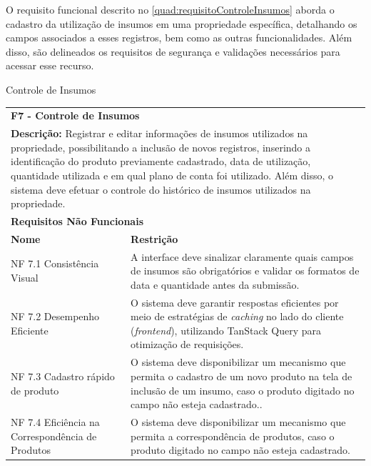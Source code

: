 O requisito funcional descrito no \autoref{quad:requisitoControleInsumos}  aborda o cadastro da utilização de insumos em uma propriedade específica, detalhando os campos associados a esses registros, bem como as outras funcionalidades. Além disso, são delineados os requisitos de segurança e validações necessários para acessar esse recurso.

\begin{tabframed}[htb]
  \caption{Controle de Insumos}
  \label{quad:requisitoControleInsumos}
  \renewcommand{\arraystretch}{1.5}
  \begin{tabular}{|l|l|}
    \cline{1-2}
    \multicolumn{2}{|l|}{\textbf{F7 - Controle de Insumos}}
    \\ \cline{1-2}

    \multicolumn{2}{|p{15cm}|}{
    \raggedright \textbf{Descrição:} Registrar e editar informações de insumos utilizados na propriedade, possibilitando a inclusão de novos registros, inserindo a identificação do produto previamente cadastrado, data de utilização, quantidade utilizada e em qual plano de conta foi utilizado. Além disso, o sistema deve efetuar o controle do histórico de insumos utilizados na propriedade.
    }
    \\ \cline{1-2}

    \multicolumn{2}{|l|}{\textbf{Requisitos Não Funcionais}}
    \\ \cline{1-2}

    \textbf{Nome}                                    &
    \textbf{Restrição}
    \\ \cline{1-2}

    NF 7.1 Consistência Visual                       &
    \multicolumn{1}{|p{8cm}|}{\raggedright A interface deve sinalizar claramente quais campos de insumos são obrigatórios e validar os formatos de data e quantidade antes da submissão.}
    \\ \cline{1-2}

    NF 7.2 Desempenho Eficiente                      &
    \multicolumn{1}{|p{8cm}|}{\raggedright O sistema deve garantir respostas eficientes por meio de estratégias de \textit{caching} no lado do cliente (\textit{frontend}), utilizando TanStack Query para otimização de requisições.}
    \\ \cline{1-2}

    NF 7.3 Cadastro rápido de produto                &
    \multicolumn{1}{|p{8cm}|}{\raggedright
    O sistema deve disponibilizar um mecanismo que permita o cadastro de um novo produto na tela de inclusão de um insumo, caso o produto digitado no campo não esteja cadastrado..}
    \\ \cline{1-2}

    NF 7.4 Eficiência na Correspondência de Produtos &
    \multicolumn{1}{|p{8cm}|}{\raggedright
    O sistema deve disponibilizar um mecanismo que permita a correspondência de produtos, caso o produto digitado no campo não esteja cadastrado.}
    \\ \cline{1-2}
  \end{tabular}
  \fonte{} %
\end{tabframed}

